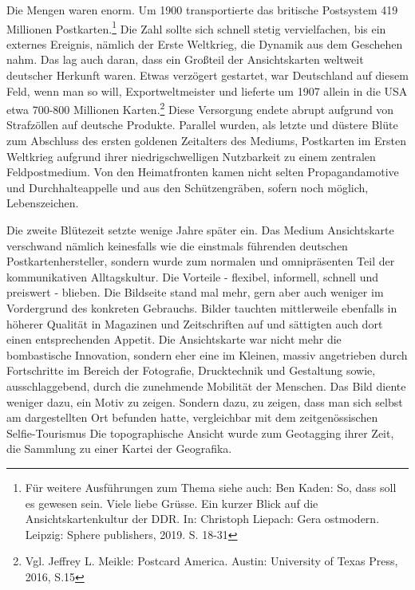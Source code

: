 \documentclass[a4paper,
fontsize=11pt,
oneside,
numbers=noperiodatend,
parskip=half-,
bibliography=totoc,
final
]{scrartcl}
\begin{document}
Die Mengen waren enorm. Um 1900 transportierte das britische Postsystem
419 Millionen Postkarten.\footnote{Für weitere Ausführungen zum Thema
  siehe auch: Ben Kaden: So, dass soll es gewesen sein. Viele liebe
  Grüsse. Ein kurzer Blick auf die Ansichtskartenkultur der DDR. In:
  Christoph Liepach: Gera ostmodern. Leipzig: Sphere publishers, 2019.
  S. 18-31} Die Zahl sollte sich schnell stetig vervielfachen, bis ein
externes Ereignis, nämlich der Erste Weltkrieg, die Dynamik aus dem
Geschehen nahm. Das lag auch daran, dass ein Großteil der Ansichtskarten
weltweit deutscher Herkunft waren. Etwas verzögert gestartet, war
Deutschland auf diesem Feld, wenn man so will, Exportweltmeister und
lieferte um 1907 allein in die USA etwa 700-800 Millionen
Karten.\footnote{Vgl. Jeffrey L. Meikle: Postcard America. Austin:
  University of Texas Press, 2016, S.15} Diese Versorgung endete abrupt
aufgrund von Strafzöllen auf deutsche Produkte. Parallel wurden, als
letzte und düstere Blüte zum Abschluss des ersten goldenen Zeitalters
des Mediums, Postkarten im Ersten Weltkrieg aufgrund ihrer
niedrigschwelligen Nutzbarkeit zu einem zentralen Feldpostmedium. Von
den Heimatfronten kamen nicht selten Propagandamotive und
Durchhalteappelle und aus den Schützengräben, sofern noch möglich,
Lebenszeichen.

Die zweite Blütezeit setzte wenige Jahre später ein. Das Medium
Ansichtskarte verschwand nämlich keinesfalls wie die einstmals führenden
deutschen Postkartenhersteller, sondern wurde zum normalen und
omnipräsenten Teil der kommunikativen Alltagskultur. Die Vorteile -
flexibel, informell, schnell und preiswert - blieben. Die Bildseite
stand mal mehr, gern aber auch weniger im Vordergrund des konkreten
Gebrauchs. Bilder tauchten mittlerweile ebenfalls in höherer Qualität in
Magazinen und Zeitschriften auf und sättigten auch dort einen
entsprechenden Appetit. Die Ansichtskarte war nicht mehr die
bombastische Innovation, sondern eher eine im Kleinen, massiv
angetrieben durch Fortschritte im Bereich der Fotografie, Drucktechnik
und Gestaltung sowie, ausschlaggebend, durch die zunehmende Mobilität
der Menschen. Das Bild diente weniger dazu, ein Motiv zu zeigen. Sondern
dazu, zu zeigen, dass man sich selbst am dargestellten Ort befunden
hatte, vergleichbar mit dem zeitgenössischen Selfie-Tourismus Die
topographische Ansicht wurde zum Geotagging ihrer Zeit, die Sammlung zu
einer Kartei der Geografika.
\end{document}
